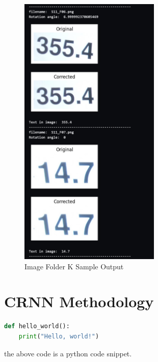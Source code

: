 \begin{figure}[ht]
    \centering
    \includegraphics[width=0.6\textwidth]{Figures/Methodology/sipa_11/sample_output.jpg}
    \caption[Image Folder K Sample Output]{Image Folder K Sample Output}
    \label{fig:Image Folder K Sample Output}
\end{figure}




\newpage

\section{CRNN Methodology}

\newpage

\begin{lstlisting}[language=Python, caption=Python example]
    def hello_world():
    print("Hello, world!")
\end{lstlisting}


the above code is a python code snippet.



